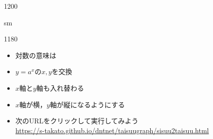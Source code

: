 \documentclass[landscape,10pt]{ujarticle}
\newcommand{\slidepage}[1][s]{%
\setcounter{ketpicctra}{18}%
\if#1m \setcounter{ketpicctra}{1}\fi
\hypersetup{linkcolor=black}%

\begin{layer}{118}{0}
\putnotee{122}{-\theketpicctra.05}{\small\thepage/\pageref{pageend}}
\end{layer}\hypersetup{linkcolor=blue}

}
\newcommand{\hako}[4][6]{\fbox{\raisebox{#2 mm}{$\mathstrut$}\raisebox{-#3 mm}{$\mathstrut$}\Ctab{#1 mm}{#4}}}
\begin{document}
\begin{layer}{120}{0}
\end{layer}

\def\mainslidetitley{22}
\def\ketcletter{slidecolora}
\def\ketcbox{slidecolorb}
\def\ketdbox{slidecolorc}
\def\ketcframe{slidecolord}
\def\ketcshadow{slidecolore}
\def\ketdshadow{slidecolorf}
\def\slidetitlex{6}
\def\slidetitlesize{1.3}
\def\mketcletter{slidecolori}
\def\mketcbox{yellow}
\def\mketdbox{yellow}
\def\mketcframe{yellow}
\def\mslidetitlex{62}
\def\mslidetitlesize{2}

\color{black}
\Large\bf\boldmath
\addtocounter{page}{-1}

\renewcommand{\hako}[4][-1]{%
\setcounter{ketpicctra}{#2}%
\divide\value{ketpicctra} by 2%
\setcounter{ketpicctrb}{#3}%
\divide\value{ketpicctrb} by 2%
\setcounter{ketpicctrc}{\theketpicctrb}%
\addtocounter{ketpicctrc}{#1}%
\def\kettmp{
\begin{picture}%
(#2, #3)(0,0)%
\settowidth{\Width}{#4}\setlength{\Width}{-0.5\Width}%
\settoheight{\Height}{#4}\settodepth{\Depth}{#4}\setlength{\Height}{-0.5\Height}\setlength{\Depth}{0.5\Depth}\addtolength{\Height}{\Depth}%
\put(\theketpicctra,\theketpicctrb){\hspace*{\Width}\raisebox{\Height}{#4}}%
\end{picture}%
}%
{\unitlength=1mm%
\raisebox{-\theketpicctrc mm}{\fbox{\kettmp}}%
}
}



\vspace*{18mm}

\slidepage
\begin{itemize}
\item
対数の意味は　
\item
$y=a^x$の$x,y$を交換
\item
$x$軸と$y$軸も入れ替わる
\item
$x$軸が横，$y$軸が縦になるようにする
\item
次のURLをクリックして実行してみよう\\
\normalsize\url{https://s-takato.github.io/dntnet/taisuugraph/sisuu2taisuu.html}
\end{itemize}




\vspace*{18mm}
\end{document}

